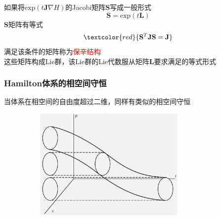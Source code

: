\begin{frame}[allowframebreaks]
{{		如果将$\mathrm{exp}(t\mathbf{J}\nabla H)$的\textrm{Jacobi}矩阵$\mathbf{S}$写成一般形式
		\begin{displaymath}
			\mathbf{S}=\mathrm{exp}(t\mathbf{L})
		\end{displaymath}}}
		$\mathbf{S}$矩阵有等式
		\begin{displaymath}
			\textcolor{red}{\mathbf{S}^T\mathbf{J}\mathbf{S}=\mathbf{J}}
		\end{displaymath}
		满足该条件的矩阵称为\textcolor{red}{保辛结构}\\

		这些矩阵构成\textrm{Lie}群，该\textrm{Lie}群的\textrm{Lie}代数服从矩阵$\mathbf{L}$要求满足的等式形式
\end{frame}

\begin{frame}
	\frametitle{\textrm{Hamilton}体系的相空间守恒}
	当体系在相空间的自由度超过二维，同样有类似的相空间守恒
\begin{figure}[h!]
\centering
\vspace*{+0.05in}
\includegraphics[height=2.15in,width=3.6in,viewport=0 0 893 655,clip]{Figures/Area-conservation-law-symplectic-flow.png}
\label{Area-conservation-law-symplectic-flow}
\end{figure}
\end{frame}


